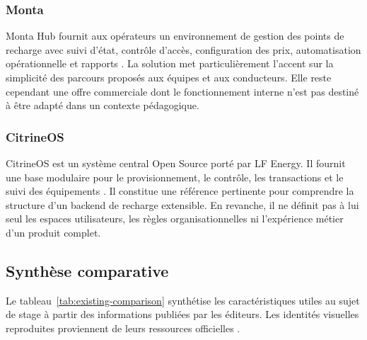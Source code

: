 \subsubsection{Monta}

Monta Hub fournit aux opérateurs un environnement de gestion des points de recharge
avec suivi d'état, contrôle d'accès, configuration des prix, automatisation
opérationnelle et rapports \cite{montaHub}. La solution met particulièrement l'accent
sur la simplicité des parcours proposés aux équipes et aux conducteurs. Elle reste
cependant une offre commerciale dont le fonctionnement interne n'est pas destiné à
être adapté dans un contexte pédagogique.

\subsubsection{CitrineOS}

CitrineOS est un système central Open Source porté par LF Energy. Il fournit une base
modulaire pour le provisionnement, le contrôle, les transactions et le suivi des
équipements \cite{citrineOS}. Il constitue une référence pertinente pour comprendre
la structure d'un backend de recharge extensible. En revanche, il ne définit pas à
lui seul les espaces utilisateurs, les règles organisationnelles ni l'expérience
métier d'un produit complet.

\subsection{Synthèse comparative}

Le tableau~\ref{tab:existing-comparison} synthétise les caractéristiques utiles au
sujet de stage à partir des informations publiées par les éditeurs. Les identités
visuelles reproduites proviennent de leurs ressources officielles
\cite{chargePointSoftware,driivzOperations,montaHub,citrineOS}.

